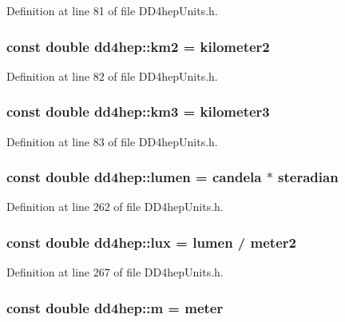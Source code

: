 Definition at line 81 of file DD4hepUnits.h.\hypertarget{namespacedd4hep_a94b468639aec795c528305ad9ba0245e}{
\subsubsection[{km2}]{\setlength{\rightskip}{0pt plus 5cm}const double {\bf dd4hep::km2} = {\bf kilometer2}}}
\label{namespacedd4hep_a94b468639aec795c528305ad9ba0245e}


Definition at line 82 of file DD4hepUnits.h.\hypertarget{namespacedd4hep_a4f0627a7e7338d69e3d58675ddbd95f6}{
\subsubsection[{km3}]{\setlength{\rightskip}{0pt plus 5cm}const double {\bf dd4hep::km3} = {\bf kilometer3}}}
\label{namespacedd4hep_a4f0627a7e7338d69e3d58675ddbd95f6}


Definition at line 83 of file DD4hepUnits.h.\hypertarget{namespacedd4hep_aca4ed36739bef9c651a4ced5a2279b40}{
\subsubsection[{lumen}]{\setlength{\rightskip}{0pt plus 5cm}const double {\bf dd4hep::lumen} = {\bf candela} $\ast$ {\bf steradian}}}
\label{namespacedd4hep_aca4ed36739bef9c651a4ced5a2279b40}


Definition at line 262 of file DD4hepUnits.h.\hypertarget{namespacedd4hep_a1c9daf57c558025c205072d26d477a99}{
\subsubsection[{lux}]{\setlength{\rightskip}{0pt plus 5cm}const double {\bf dd4hep::lux} = {\bf lumen} / {\bf meter2}}}
\label{namespacedd4hep_a1c9daf57c558025c205072d26d477a99}


Definition at line 267 of file DD4hepUnits.h.\hypertarget{namespacedd4hep_a443d1517e365c8f0c3a498bff0f09088}{
\subsubsection[{m}]{\setlength{\rightskip}{0pt plus 5cm}const double {\bf dd4hep::m} = {\bf meter}}}
\label{namespacedd4hep_a443d1517e365c8f0c3a498bff0f09088}



